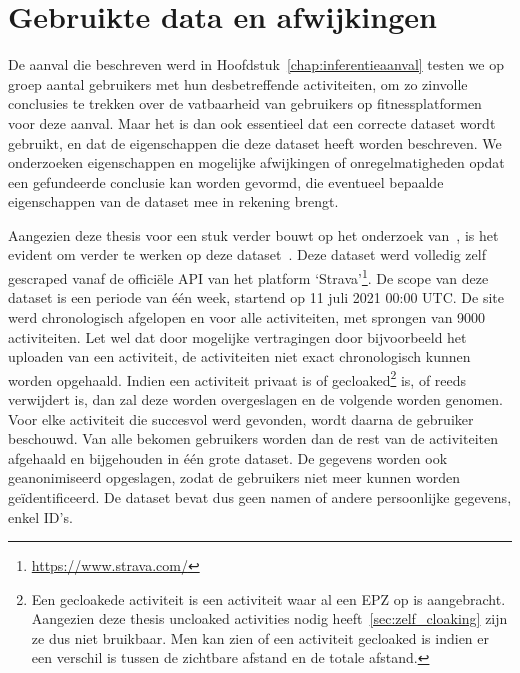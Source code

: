 \chapter{Gebruikte data en afwijkingen}
De aanval die beschreven werd in Hoofdstuk~\ref{chap:inferentieaanval} testen
we op groep aantal gebruikers met hun desbetreffende activiteiten, om zo
zinvolle conclusies te trekken over de vatbaarheid van gebruikers op
fitnessplatformen voor deze aanval. Maar het is dan ook essentieel dat een
correcte dataset wordt gebruikt, en dat de eigenschappen die deze dataset heeft
worden beschreven. We onderzoeken eigenschappen en mogelijke afwijkingen of
onregelmatigheden opdat een gefundeerde conclusie kan worden gevormd, die
eventueel bepaalde eigenschappen van de dataset mee in rekening brengt.

Aangezien deze thesis voor een stuk verder bouwt op het onderzoek
van~\citeauthor{Dhondt_Pochat_Voulimeneas_Joosen_Volckaert_2022}, is het
evident om verder te werken op deze
dataset~\cite{Dhondt_Pochat_Voulimeneas_Joosen_Volckaert_2022}. Deze dataset
werd volledig zelf gescraped vanaf de officiële \ac{API} van het platform
`Strava'\footnote{\url{https://www.strava.com/}}. De scope van deze dataset is
een periode van één week, startend op 11 juli 2021 00:00 \ac{UTC}. De site werd
chronologisch afgelopen en voor alle activiteiten, met sprongen van 9000
activiteiten. Let wel dat door mogelijke vertragingen door bijvoorbeeld het
uploaden van een activiteit, de activiteiten niet exact chronologisch kunnen
worden opgehaald. Indien een activiteit privaat is of gecloaked\footnote{Een
    gecloakede activiteit is een activiteit waar al een EPZ op is aangebracht.
    Aangezien deze thesis uncloaked activities nodig heeft~\ref{sec:zelf_cloaking}
    zijn ze dus niet bruikbaar. Men kan zien of een activiteit gecloaked is indien
    er een verschil is tussen de zichtbare afstand en de totale afstand.} is, of
reeds verwijdert is, dan zal deze worden overgeslagen en de volgende worden
genomen. Voor elke activiteit die succesvol werd gevonden, wordt daarna de
gebruiker beschouwd. Van alle bekomen gebruikers worden dan de rest van de
activiteiten afgehaald en bijgehouden in één grote dataset. De gegevens worden
ook geanonimiseerd opgeslagen, zodat de gebruikers niet meer kunnen worden
geïdentificeerd. De dataset bevat dus geen namen of andere persoonlijke
gegevens, enkel ID's.

